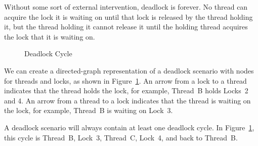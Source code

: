 Without some sort of external intervention, deadlock is forever.
No thread can acquire the lock it is waiting on until that
lock is released by the thread holding it, but the thread holding
it cannot release it until the holding thread acquires the lock that
it is waiting on.

\begin{figure}[tb]
\centering
{}
\caption{Deadlock Cycle}
\label{fig:locking:Deadlock Cycle}
\end{figure}

We can create a directed-graph representation of a deadlock scenario
with nodes for threads and locks, as shown in
Figure~\ref{fig:locking:Deadlock Cycle}.
An arrow from a lock to a thread indicates that the thread holds
the lock, for example, Thread~B holds Locks~2 and 4.
An arrow from a thread to a lock indicates that the thread is waiting
on the lock, for example, Thread~B is waiting on Lock~3.

A deadlock scenario will always contain at least one deadlock cycle.
In Figure~\ref{fig:locking:Deadlock Cycle}, this cycle is
Thread~B, Lock~3, Thread~C, Lock~4, and back to Thread~B.

